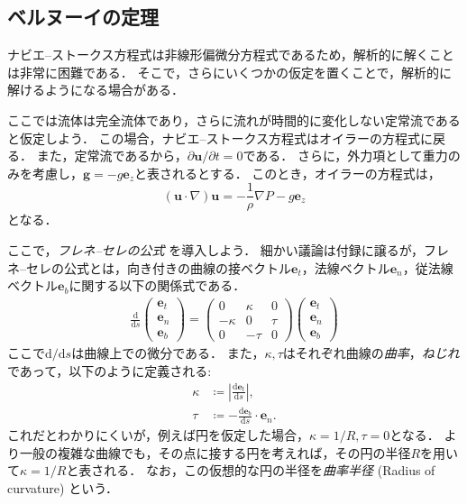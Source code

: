 \documentclass[uplatex,dvipdfmx,a4j,11pt]{jsreport}
\newcommand{\e}{\mathbf{e}} %
\newcommand{\diff}{\mathrm{d}} %
\numberwithin{equation}{chapter}
\begin{document}
\subsection{ベルヌーイの定理}
ナビエ--ストークス方程式は非線形偏微分方程式であるため，解析的に解くことは非常に困難である．
そこで，さらにいくつかの仮定を置くことで，解析的に解けるようになる場合がある．

ここでは流体は完全流体であり，さらに流れが時間的に変化しない定常流であると仮定しよう．
この場合，ナビエ--ストークス方程式はオイラーの方程式に戻る．
また，定常流であるから，$\partial \mathbf{u}/\partial t = 0$である．
さらに，外力項として重力のみを考慮し，$\mathbf{g} = -g \e_z$と表されるとする．
このとき，オイラーの方程式は， 
\begin{equation*}
  (\mathbf{u}\cdot \nabla)\mathbf{u} = -\frac{1}{\rho} \nabla P - g \e_z
\end{equation*}
となる．

ここで，\emph{フレネ--セレの公式} を導入しよう．
細かい議論は付録に譲るが，フレネ--セレの公式とは，向き付きの曲線の接ベクトル$\e_t$，法線ベクトル$\e_n$，従法線ベクトル$\e_b$に関する以下の関係式である．
\begin{align*}
  \frac{\diff }{\diff s}
  \begin{pmatrix}
    \e_t \\
    \e_n \\
    \e_b
  \end{pmatrix}
  =
  \begin{pmatrix}
    0 & \kappa & 0\\
    -\kappa & 0 & \tau\\
    0 & -\tau & 0
  \end{pmatrix}
  \begin{pmatrix}
    \e_t \\
    \e_n \\
    \e_b
  \end{pmatrix}
\end{align*}
ここで$\diff/\diff s$は曲線上での微分である．
また，$\kappa, \tau$はそれぞれ曲線の\emph{曲率}，\emph{ねじれ}であって，以下のように定義される:
\begin{align*}
  \kappa &\coloneqq \left|\frac{\diff \e_t}{\diff s}\right|,\\
  \tau &\coloneqq -\frac{\diff \e_b}{\diff s} \cdot \e_n.
\end{align*}
これだとわかりにくいが，例えば円を仮定した場合，$\kappa = 1/R, \tau = 0$となる．
より一般の複雑な曲線でも，その点に接する円を考えれば，その円の半径$R$を用いて$\kappa = 1/R$と表される．
なお，この仮想的な円の半径を\emph{曲率半径} (Radius of curvature) という．
\end{document}
